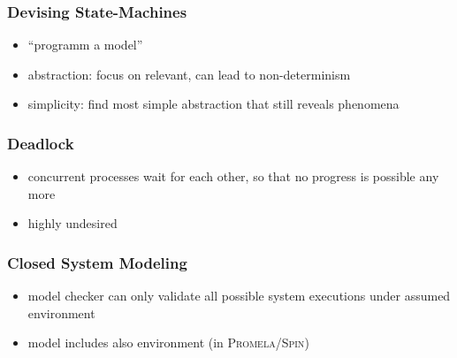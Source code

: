 \documentclass[a4paper, 10pt]{article}
\begin{document}
\subsubsection*{Devising State-Machines}
\begin{itemize}
    \item ``programm a model''
    \item abstraction: focus on relevant, can lead to non-determinism
    \item simplicity: find most simple abstraction that still reveals phenomena
\end{itemize}

\subsubsection*{Deadlock}
\begin{itemize}
    \item concurrent processes wait for each other, so that no progress is possible any more
    \item highly undesired
\end{itemize}

\subsubsection*{Closed System Modeling}
\begin{itemize}
    \item model checker can only validate all possible system executions under assumed environment
    \item model includes also environment (in \textsc{Promela/Spin})
\end{itemize}

\newpage
\end{document}
